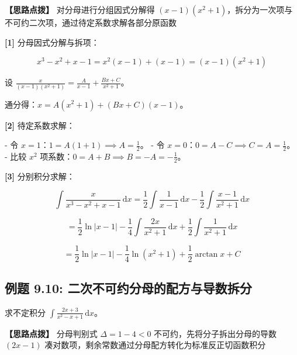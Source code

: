 \documentclass[11pt,a4paper,UTF8]{ctexart}
\begin{document}
\textbf{\color{DeepPurple}【思路点拨】} 对分母进行分组因式分解得 $(x-1)(x^2+1)$，拆分为一次项与不可约二次项，通过待定系数求解各部分原函数


\begin{solbox}[分步推导与答题规范]
\textbf{[1]} 分母因式分解与拆项：


\begin{equation*}
x^3 - x^2 + x - 1 = x^2(x-1) + (x-1) = (x-1)(x^2+1)
\end{equation*}


设 $\frac{x}{(x-1)(x^2+1)} = \frac{A}{x-1} + \frac{Bx+C}{x^2+1}$。

通分得：$x = A(x^2+1) + (Bx+C)(x-1)$。

\textbf{[2]} 待定系数求解：

- 令 $x=1$：$1 = A(1+1) \implies A = \frac{1}{2}$。
- 令 $x=0$：$0 = A - C \implies C = A = \frac{1}{2}$。
- 比较 $x^2$ 项系数：$0 = A + B \implies B = -A = -\frac{1}{2}$。

\textbf{[3]} 分别积分求解：


\begin{equation*}
\int \frac{x}{x^3-x^2+x-1}\,\mathrm{d}x = \frac{1}{2}\int \frac{1}{x-1}\,\mathrm{d}x - \frac{1}{2}\int \frac{x-1}{x^2+1}\,\mathrm{d}x
\end{equation*}



\begin{equation*}
= \frac{1}{2}\ln|x-1| - \frac{1}{4}\int \frac{2x}{x^2+1}\,\mathrm{d}x + \frac{1}{2}\int \frac{1}{x^2+1}\,\mathrm{d}x
\end{equation*}



\begin{equation*}
= \frac{1}{2}\ln|x-1| - \frac{1}{4}\ln(x^2+1) + \frac{1}{2}\arctan x + C
\end{equation*}

\end{solbox}


\subsection{例题 9.10: 二次不可约分母的配方与导数拆分}

求不定积分 $\int \frac{2x+3}{x^2-x+1}\,\mathrm{d}x$。

\textbf{\color{DeepPurple}【思路点拨】} 分母判别式 $\Delta = 1 - 4 < 0$ 不可约，先将分子拆出分母的导数 $(2x-1)$ 凑对数项，剩余常数通过分母配方转化为标准反正切函数积分
\end{document}
